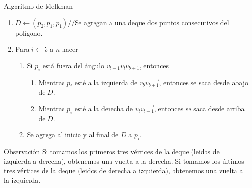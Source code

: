 \documentclass[aspectratio=169,xcolor=dvipsnames, t]{beamer}
\begin{document}
\begin{frame}{Algoritmo de Melkman}
  \begin{enumerate}
  \item $D\gets (p_{2},p_{1},p_{1}) // $Se agregan a una deque dos puntos consecutivos del polígono.
  \item Para $i\gets 3$ a $n$ hacer:
    \begin{enumerate}
    \item Si $p_{i}$ está fuera del ángulo $v_{t-1}v_tv_{b+1}$, entonces
      \begin{enumerate}
      \item Mientras $p_{i}$ esté a la izquierda de $\overrightarrow{v_{b}v_{b+1}}$, entonces se saca desde abajo de $D$.
      \item Mientras $p_{i}$ esté a la derecha de $\overrightarrow{v_{t}v_{t-1}}$, entonces se saca desde arriba de $D$.
      \end{enumerate}
    \item Se agrega al inicio y al final de $D$ a $p_{i}$.
    \end{enumerate}
  \end{enumerate}
  \begin{block}{Observación}
    \small
    Si tomamos los primeros tres vértices de la deque (leidos de izquierda a derecha), obtenemos una vuelta a la derecha. Si tomamos los últimos tres vértices de la deque (leidos de derecha a izquierda), obtenemos una vuelta a la izquierda.
  \end{block}
\end{frame}
\end{document}
